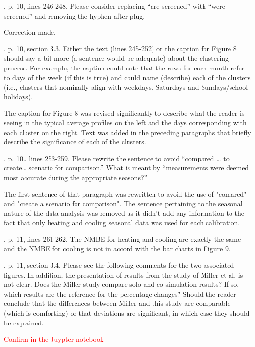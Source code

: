\documentclass[answers,12pt]{exam}
\begin{document}
\begin{questions}
. p. 10, lines 246-248.  Please consider replacing “are screened” with “were screened” and removing the hyphen after plug. 
\begin{solution}
Correction made.
\end{solution}

. p. 10, section 3.3.  Either the text (lines 245-252) or the caption for Figure 8 should say a bit more (a sentence would be adequate) about the clustering process.  For example, the caption could note that the rows for each month refer to days of the week (if this is true) and could name (describe) each of the clusters (i.e., clusters that nominally align with weekdays, Saturdays and Sundays/school holidays). 
\begin{solution}
The caption for Figure 8 was revised significantly to describe what the reader is seeing in the typical average profiles on the left and the days corresponding with
each cluster on the right. Text was added in the preceding paragraphs that briefly describe the significance of each of the clusters.
\end{solution}

. p. 10., lines 253-259.  Please rewrite the sentence to avoid “compared … to create… scenario for comparison.” What is meant by “measurements were deemed most accurate during the appropriate seasons?”
\begin{solution}
The first sentence of that paragraph was rewritten to avoid the use of "comared" and "create a scenario for comparison". The sentence pertaining to the seasonal nature of the data analysis was removed as it didn't add any information to the fact that only heating and cooling seasonal data was used for each calibration.
\end{solution}

. p. 11, lines 261-262.  The NMBE for heating and cooling are exactly the same and the NMBE for cooling is not in accord with the bar charts in Figure 9. 
\begin{solution}
\end{solution}

. p. 11, section 3.4.  Please see the following comments for the two associated figures.  In addition, the presentation of results from the study of Miller et al. is not clear.  Does the Miller study compare solo and co-simulation results?  If so, which results are the reference for the percentage changes? Should the reader conclude that the differences between Miller and this study are comparable (which is comforting) or that deviations are significant, in which case they should be explained. 
\begin{solution}
\textcolor{red}{Confirm in the Juypter notebook}
\end{solution}


\end{questions}
\end{document}
